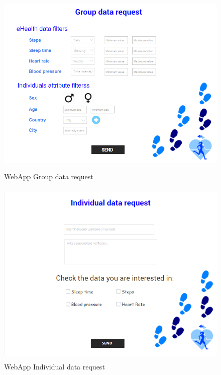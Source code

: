 \begin{figure}[H]
\centering
  \includegraphics[width=12cm,height=9cm]{resources/Screen/Groupdatarequest.png}
  \caption{WebApp Group data request}
  \label{fig:WebApp GroupData Request}
\end{figure}


\begin{figure}[H]
\centering
  \includegraphics[width=12cm,height=9cm]{resources/Screen/individualdatarequest.png}
  \caption{WebApp Individual data request}
  \label{fig:WebApp Individual data request}
\end{figure}


